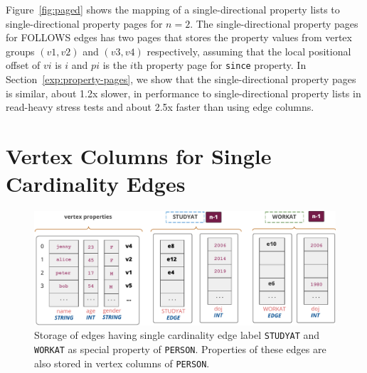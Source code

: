 Figure~\ref{fig:paged} shows the mapping of a single-directional property lists to single-directional  property pages for $n=2$. The single-directional property pages for FOLLOWS edges has two pages that stores the property values from vertex groups $(v1,v2)$ and $(v3,v4)$ respectively, assuming that the local positional offset of $vi$ is $i$ and $pi$ is the $i$th property page for \texttt{since} property. 
In Section~\ref{exp:property-pages}, we show that the single-directional  property pages is similar, about 1.2x slower, in performance to single-directional property lists in read-heavy stress tests and about 2.5x faster than using edge columns. 

\section{Vertex Columns for Single Cardinality Edges}
\label{sec:single-cardinality-cols}

\begin{figure}
	\hfill\includegraphics[scale=0.78]{img/single-cardinality-cols}\hspace*{\fill}
	\captionsetup{justification=centering}
	\caption{Storage of edges having single cardinality edge label \texttt{STUDYAT} and \texttt{WORKAT} as special property of \texttt{PERSON}. \hspace{\textwidth} Properties of these edges are also stored in vertex columns of \texttt{PERSON}.}
	\label{fig:single-cardinality-cols}
\end{figure} 


